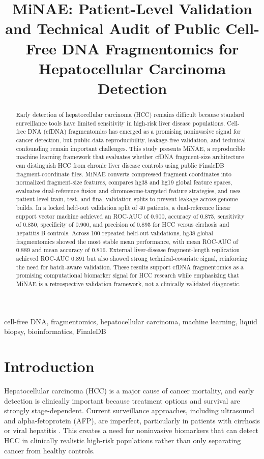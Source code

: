 \documentclass[conference]{IEEEtran}
\title{MiNAE: Patient-Level Validation and Technical Audit of Public Cell-Free DNA Fragmentomics for Hepatocellular Carcinoma Detection}
\author{}
\begin{document}
\maketitle

\begin{abstract}
Early detection of hepatocellular carcinoma (HCC) remains difficult because standard surveillance tools have limited sensitivity in high-risk liver disease populations. Cell-free DNA (cfDNA) fragmentomics has emerged as a promising noninvasive signal for cancer detection, but public-data reproducibility, leakage-free validation, and technical confounding remain important challenges. This study presents MiNAE, a reproducible machine learning framework that evaluates whether cfDNA fragment-size architecture can distinguish HCC from chronic liver disease controls using public FinaleDB fragment-coordinate files. MiNAE converts compressed fragment coordinates into normalized fragment-size features, compares hg38 and hg19 global feature spaces, evaluates dual-reference fusion and chromosome-targeted feature strategies, and uses patient-level train, test, and final validation splits to prevent leakage across genome builds. In a locked held-out validation split of 40 patients, a dual-reference linear support vector machine achieved an ROC-AUC of 0.900, accuracy of 0.875, sensitivity of 0.850, specificity of 0.900, and precision of 0.895 for HCC versus cirrhosis and hepatitis B controls. Across 100 repeated held-out validations, hg38 global fragmentomics showed the most stable mean performance, with mean ROC-AUC of 0.889 and mean accuracy of 0.816. External liver-disease fragment-length replication achieved ROC-AUC 0.891 but also showed strong technical-covariate signal, reinforcing the need for batch-aware validation. These results support cfDNA fragmentomics as a promising computational biomarker signal for HCC research while emphasizing that MiNAE is a retrospective validation framework, not a clinically validated diagnostic.
\end{abstract}

\begin{IEEEkeywords}
cell-free DNA, fragmentomics, hepatocellular carcinoma, machine learning, liquid biopsy, bioinformatics, FinaleDB
\end{IEEEkeywords}

\section{Introduction}
Hepatocellular carcinoma (HCC) is a major cause of cancer mortality, and early detection is clinically important because treatment options and survival are strongly stage-dependent. Current surveillance approaches, including ultrasound and alpha-fetoprotein (AFP), are imperfect, particularly in patients with cirrhosis or viral hepatitis \cite{tzartzeva2018surveillance}. This creates a need for noninvasive biomarkers that can detect HCC in clinically realistic high-risk populations rather than only separating cancer from healthy controls.
\end{document}
